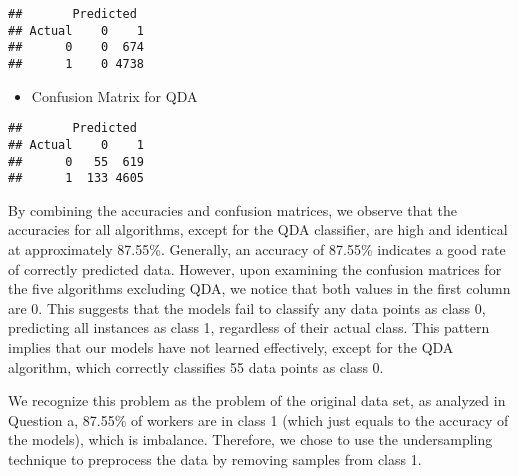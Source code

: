 \documentclass[
]{article}
\newenvironment{Shaded}{\begin{snugshade}}{\end{snugshade}}
\newcommand{\AttributeTok}[1]{\textcolor[rgb]{0.13,0.29,0.53}{#1}}
\newcommand{\DecValTok}[1]{\textcolor[rgb]{0.00,0.00,0.81}{#1}}
\newcommand{\FunctionTok}[1]{\textcolor[rgb]{0.13,0.29,0.53}{\textbf{#1}}}
\newcommand{\NormalTok}[1]{#1}
\newcommand{\OtherTok}[1]{\textcolor[rgb]{0.56,0.35,0.01}{#1}}
\newcommand{\SpecialCharTok}[1]{\textcolor[rgb]{0.81,0.36,0.00}{\textbf{#1}}}
\newcommand{\StringTok}[1]{\textcolor[rgb]{0.31,0.60,0.02}{#1}}
\providecommand{\tightlist}{%
  \setlength{\itemsep}{0pt}\setlength{\parskip}{0pt}}
\begin{document}
\begin{verbatim}
##       Predicted
## Actual    0    1
##      0    0  674
##      1    0 4738
\end{verbatim}

\begin{itemize}
\tightlist
\item
  Confusion Matrix for QDA
\end{itemize}

\begin{Shaded}
\end{Shaded}

\begin{verbatim}
##       Predicted
## Actual    0    1
##      0   55  619
##      1  133 4605
\end{verbatim}

By combining the accuracies and confusion matrices, we observe that the
accuracies for all algorithms, except for the QDA classifier, are high
and identical at approximately 87.55\%. Generally, an accuracy of
87.55\% indicates a good rate of correctly predicted data. However, upon
examining the confusion matrices for the five algorithms excluding QDA,
we notice that both values in the first column are 0. This suggests that
the models fail to classify any data points as class 0, predicting all
instances as class 1, regardless of their actual class. This pattern
implies that our models have not learned effectively, except for the QDA
algorithm, which correctly classifies 55 data points as class 0.

We recognize this problem as the problem of the original data set, as
analyzed in Question a, 87.55\% of workers are in class 1 (which just
equals to the accuracy of the models), which is imbalance. Therefore, we
chose to use the undersampling technique to preprocess the data by
removing samples from class 1.
\end{document}
